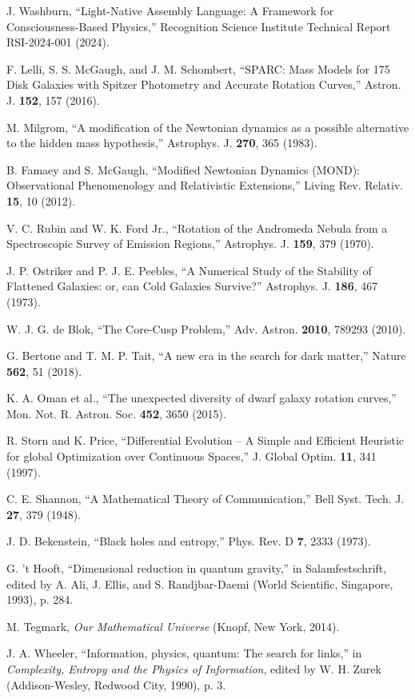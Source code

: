 \documentclass[twocolumn,prd,amsmath,amssymb,aps,superscriptaddress,nofootinbib]{revtex4-2}
\begin{document}
\begin{thebibliography}{99}

 J. Washburn, ``Light-Native Assembly Language: A Framework for Consciousness-Based Physics,'' Recognition Science Institute Technical Report RSI-2024-001 (2024).

 F. Lelli, S. S. McGaugh, and J. M. Schombert, ``SPARC: Mass Models for 175 Disk Galaxies with Spitzer Photometry and Accurate Rotation Curves,'' Astron. J. \textbf{152}, 157 (2016).

 M. Milgrom, ``A modification of the Newtonian dynamics as a possible alternative to the hidden mass hypothesis,'' Astrophys. J. \textbf{270}, 365 (1983).

 B. Famaey and S. McGaugh, ``Modified Newtonian Dynamics (MOND): Observational Phenomenology and Relativistic Extensions,'' Living Rev. Relativ. \textbf{15}, 10 (2012).

 V. C. Rubin and W. K. Ford Jr., ``Rotation of the Andromeda Nebula from a Spectroscopic Survey of Emission Regions,'' Astrophys. J. \textbf{159}, 379 (1970).

 J. P. Ostriker and P. J. E. Peebles, ``A Numerical Study of the Stability of Flattened Galaxies: or, can Cold Galaxies Survive?'' Astrophys. J. \textbf{186}, 467 (1973).

 W. J. G. de Blok, ``The Core-Cusp Problem,'' Adv. Astron. \textbf{2010}, 789293 (2010).

 G. Bertone and T. M. P. Tait, ``A new era in the search for dark matter,'' Nature \textbf{562}, 51 (2018).

 K. A. Oman et al., ``The unexpected diversity of dwarf galaxy rotation curves,'' Mon. Not. R. Astron. Soc. \textbf{452}, 3650 (2015).

 R. Storn and K. Price, ``Differential Evolution -- A Simple and Efficient Heuristic for global Optimization over Continuous Spaces,'' J. Global Optim. \textbf{11}, 341 (1997).

 C. E. Shannon, ``A Mathematical Theory of Communication,'' Bell Syst. Tech. J. \textbf{27}, 379 (1948).

 J. D. Bekenstein, ``Black holes and entropy,'' Phys. Rev. D \textbf{7}, 2333 (1973).

 G. 't Hooft, ``Dimensional reduction in quantum gravity,'' in Salamfestschrift, edited by A. Ali, J. Ellis, and S. Randjbar-Daemi (World Scientific, Singapore, 1993), p. 284.

 M. Tegmark, \emph{Our Mathematical Universe} (Knopf, New York, 2014).

 J. A. Wheeler, ``Information, physics, quantum: The search for links,'' in \emph{Complexity, Entropy and the Physics of Information}, edited by W. H. Zurek (Addison-Wesley, Redwood City, 1990), p. 3.

\end{thebibliography}
\end{document}
